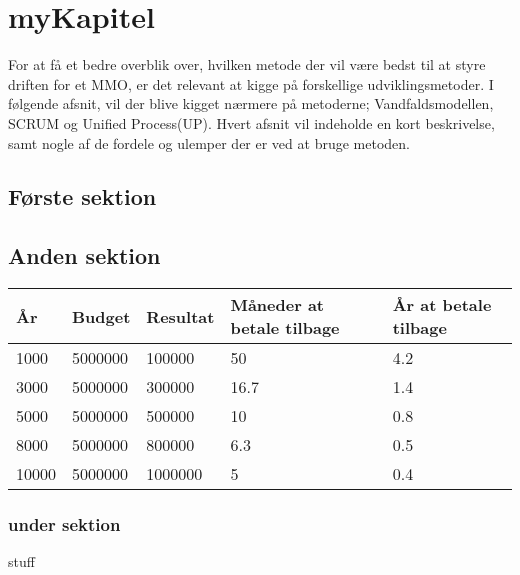 \cfoot{\page\textbackslash \totalp} %
\chapter{myKapitel}
For at få et bedre overblik over, hvilken metode der vil være bedst til at styre driften for et MMO, er det relevant at kigge på forskellige udviklingsmetoder. I følgende afsnit, vil der blive kigget nærmere på metoderne; Vandfaldsmodellen, SCRUM og Unified Process(UP). Hvert afsnit vil indeholde en kort beskrivelse, samt nogle af de fordele og ulemper der er ved at bruge metoden.\\
\section{Første sektion}

\section{Anden sektion}

\begin{tabularx}{0.75\textwidth}{|X|X|X|X|X|}
\hline
År & Budget & Resultat & Måneder at betale tilbage & År at betale tilbage \\ \hline \hline
1000 & 5000000 & 100000 & 50 & 4.2 \\ \hline
3000 & 5000000 & 300000 & 16.7 & 1.4 \\ \hline
5000 & 5000000 & 500000 & 10 & 0.8 \\ \hline
8000 & 5000000 & 800000 & 6.3 & 0.5 \\ \hline
10000 & 5000000 & 1000000 & 5 & 0.4 \\ \hline
\end{tabularx}

\subsection{under sektion}

\cite{HTL}stuff
